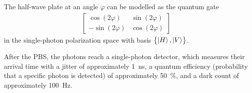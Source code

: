 \documentclass[main.tex]{subfiles}
\begin{document}
The half-wave plate at an angle \(\varphi \) can be modelled as the quantum gate 
%
\begin{align}
\left[\begin{array}{cc}
\cos(2 \varphi ) & \sin(2 \varphi ) \\ 
- \sin(2 \varphi ) & \cos(2 \varphi )
\end{array}\right]
\end{align}
%
in the single-photon polarization space with basis \(\qty{\ket{H}, \ket{V}}\).

After the PBS, the photons reach a single-photon detector, which measures their arrival time with a jitter of approximately \SI{1}{ns}, a quantum efficiency (probability that a specific photon is detected) of approximately \SI{50}{\percent}, and a dark count of approximately \SI{100}{Hz}. 
\end{document}
